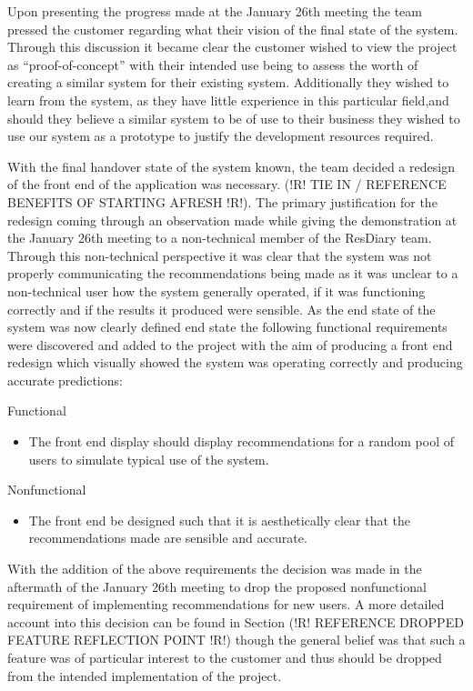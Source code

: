 \documentclass{l3proj}
\begin{document}
Upon presenting the progress made at the January 26th meeting the team pressed the customer regarding what their vision of the final state of the system. Through this discussion it became clear the customer wished to view the project as “proof-of-concept” with their intended use being to assess the worth of creating a similar system for their existing system. Additionally they wished to learn from the system, as they have little experience in this particular field,and should they believe a similar system to be of use to their business they wished to use our system as a prototype to justify the development resources required. 

With the final handover state of the system known, the team decided a redesign of the front end of the application was necessary. (!R! TIE IN / REFERENCE BENEFITS OF STARTING AFRESH !R!). The primary justification for the redesign coming through an observation made while giving the demonstration at the January 26th meeting to a non-technical member of the ResDiary team. Through this non-technical perspective it was clear that the system was not properly communicating the recommendations being made as it was unclear to a non-technical user how the system generally operated, if it was functioning correctly and if the results it produced were sensible. As the end state of the system was now clearly defined end state the following functional requirements were discovered and added to the project with the aim of producing a front end redesign which visually showed the system was operating correctly and producing accurate predictions:

Functional
\begin{itemize}
\item The front end display should display recommendations for a random pool of users to simulate typical use of the system.
\end{itemize}

Nonfunctional
\begin{itemize}
\item The front end be designed such that it is aesthetically clear that the recommendations made are sensible and accurate.
\end{itemize}

With the addition of the above requirements the decision was made in the aftermath of the January 26th meeting to drop the proposed nonfunctional requirement of implementing recommendations for new users. A more detailed account into this decision can be found in Section (!R! REFERENCE DROPPED FEATURE REFLECTION POINT !R!) though the general belief was that such a feature was of particular interest to the customer and thus should be dropped from the intended implementation of the project.
\end{document}
